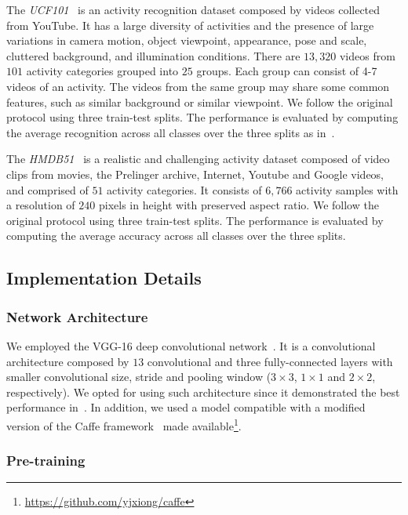 \documentclass[10pt,conference]{IEEEtran}
\begin{document}
The \emph{UCF101}~\cite{Soomro:2012} is an activity recognition dataset composed by videos collected from YouTube. It has a large diversity of activities and the presence of large variations in camera motion, object viewpoint, appearance, pose and scale, cluttered background, and illumination conditions. There are $13,320$ videos from $101$ activity categories grouped into $25$ groups. Each group can consist of 4-7 videos of an activity. The videos from the same group may share some common features, such as similar background or similar viewpoint. We follow the original protocol using three train-test splits. The performance is evaluated by computing the average recognition across all classes over the three splits as in~\cite{Wang:2015}.

The \emph{HMDB51}~\cite{Kuehne:2011} is a realistic and challenging activity dataset composed of video clips from movies, the Prelinger archive, Internet, Youtube and Google videos, and comprised of $51$ activity categories. It consists of $6,766$ activity samples with a resolution of $240$ pixels in height with preserved aspect ratio. We follow the original protocol using three train-test splits. The performance is evaluated by computing the average accuracy across all classes over the three splits.


\subsection{Implementation Details}

\subsubsection{Network Architecture}

We employed the VGG-16 deep convolutional network~\cite{Simonyan:2014b}. It is a convolutional architecture composed by $13$ convolutional and three fully-connected layers with smaller convolutional size, stride and pooling window ($3 \times 3$, $1 \times 1$ and $2 \times 2$, respectively). We opted for using such architecture since it demonstrated the best performance in~\cite{Wang:2015}. In addition, we used a model compatible with a modified version of the Caffe framework~\cite{Jia:2014} made available\footnote{\url{https://github.com/yjxiong/caffe}}.

\subsubsection{Pre-training}
\end{document}
